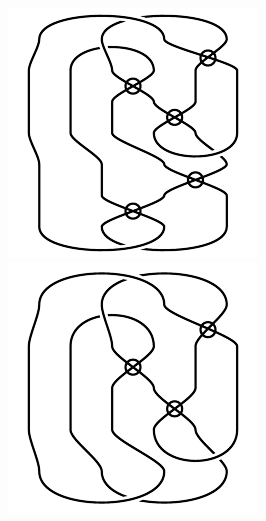 \begin{figure}[H]
\begin{minipage}[b]{.18\linewidth}
\end{minipage}
\begin{minipage}[b]{.18\linewidth}
\centering
\includegraphics[width=\linewidth]{../data/virtual_4_19.png}
\end{minipage}
\begin{minipage}[b]{.18\linewidth}
\centering
\includegraphics[width=\linewidth]{../data/virtual_4_20.png}

\end{minipage}
\end{figure}
